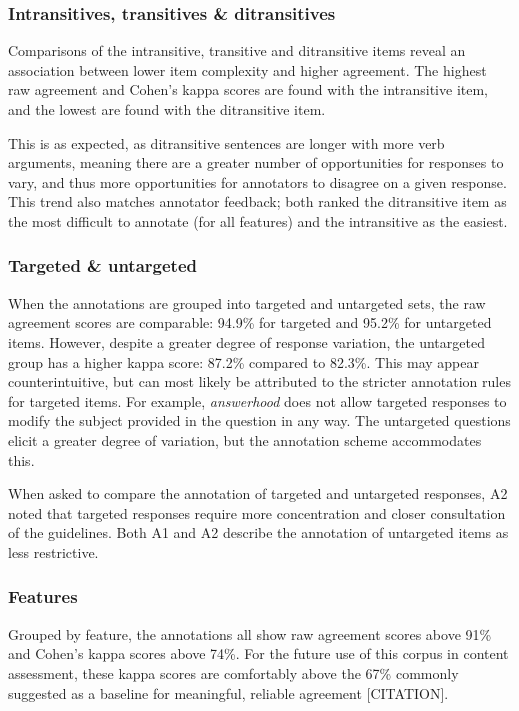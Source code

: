 \documentclass[11pt,a4paper]{article}
\begin{document}
\subsubsection{Intransitives, transitives \& ditransitives} Comparisons of the intransitive, transitive and ditransitive items reveal an association between lower item complexity and higher agreement. The highest raw agreement and Cohen's kappa scores are found with the intransitive item, and the lowest are found with the ditransitive item. 

This is as expected, as ditransitive sentences are longer with more verb arguments, meaning there are a greater number of opportunities for responses to vary, and thus more opportunities for annotators to disagree on a given response. This trend also matches annotator feedback; both ranked the ditransitive item as the most difficult to annotate (for all features) and the intransitive as the easiest.

\subsubsection{Targeted \& untargeted} When the annotations are grouped into targeted and untargeted sets, the raw agreement scores are comparable: 94.9\% for targeted and 95.2\% for untargeted items. However, despite a greater degree of response variation, the untargeted group has a higher kappa score: 87.2\% compared to 82.3\%.  This may appear counterintuitive, but can most likely be attributed to the stricter annotation rules for targeted items. For example, \textit{answerhood} does not allow targeted responses to modify the subject provided in the question in any way. The untargeted questions elicit a greater degree of variation, but the annotation scheme accommodates this. 

When asked to compare the annotation of targeted and untargeted responses, A2 noted that targeted responses require more concentration and closer consultation of the guidelines. Both A1 and A2 describe the annotation of untargeted items as less restrictive.

\subsubsection{Features} Grouped by feature, the annotations all show raw agreement scores above 91\% and Cohen's kappa scores above 74\%. For the future use of this corpus in content assessment, these kappa scores are comfortably above the 67\% commonly suggested as a baseline for meaningful, reliable agreement [CITATION].
\end{document}

